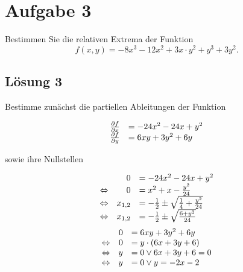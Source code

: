 \documentclass[main.tex]{subfiles}
\begin{document}
\section{Aufgabe 3}
Bestimmen Sie die relativen Extrema der Funktion
$$
    f(x,y) = -8x^3 -12x^2 +3x\cdot y^2 + y^3 +3y^2.
$$

\subsection{Lösung 3}

Bestimme zunächst die partiellen Ableitungen der Funktion

$$
    \begin{array}{r l}
        \frac{\partial f}{\partial x} & = -24x^2 - 24x + y^2\\
        \frac{\partial f}{\partial y} & = 6xy + 3y^2 + 6y
    \end{array}
$$

sowie ihre Nullstellen

$$
    \begin{array}{r r l}
                        & 0       & = -24x^2 - 24x + y^2 \\
        \Leftrightarrow & 0       & = x^2 + x - \frac{y^2}{24} \\
        \Leftrightarrow & x_{1,2} & = - \frac{1}{2} \pm \sqrt{\frac{1}{4} + \frac{y^2}{24}} \\
        \Leftrightarrow & x_{1,2} & = - \frac{1}{2} \pm \sqrt{\frac{6 + y^2}{24}} \\
    \end{array}
$$
$$
    \begin{array}{r r l}
                        & 0 & = 6xy + 3y^2 + 6y \\
        \Leftrightarrow & 0 & = y \cdot (6x + 3y +6) \\
        \Leftrightarrow & y & = 0 \vee 6x + 3y +6 = 0 \\
        \Leftrightarrow & y & = 0 \vee y = -2x -2
    \end{array}
$$
\end{document}
